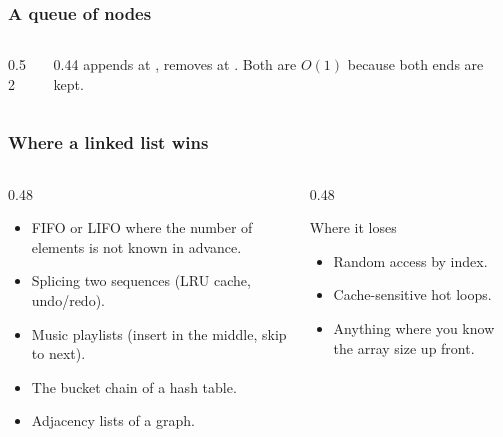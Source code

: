 \documentclass[aspectratio=169,10pt,compress]{beamer}
\begin{document}
\begin{frame}[t,fragile]\frametitle{A queue of nodes}
  \begin{columns}[T]
    \begin{column}{0.52\textwidth}
    \end{column}
    \begin{column}{0.44\textwidth}
      \small
       appends at ,  removes
      at . Both are $O(1)$ because both ends are kept.
    \end{column}
  \end{columns}
\end{frame}


\begin{frame}[t,fragile]\frametitle{Where a linked list wins}
  \begin{columns}[T]
    \begin{column}{0.48\textwidth}
      \begin{itemize}\small
        \item FIFO or LIFO where the number of elements is not known
              in advance.
        \item Splicing two sequences (LRU cache, undo/redo).
        \item Music playlists (insert in the middle, skip to next).
        \item The bucket chain of a hash table.
        \item Adjacency lists of a graph.
      \end{itemize}
    \end{column}
    \begin{column}{0.48\textwidth}
      \begin{block}{Where it loses}
        \small
        \begin{itemize}
          \item Random access by index.
          \item Cache-sensitive hot loops.
          \item Anything where you know the array size up front.
        \end{itemize}
      \end{block}
    \end{column}
  \end{columns}
\end{frame}
\end{document}
